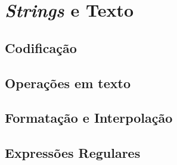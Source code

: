 \chapter[c:strings]{\textit{Strings} e Texto}
    
    \section*{Codificação}

    \section*{Operações em texto}

    \section*{Formatação e Interpolação}

    \section*{Expressões Regulares}